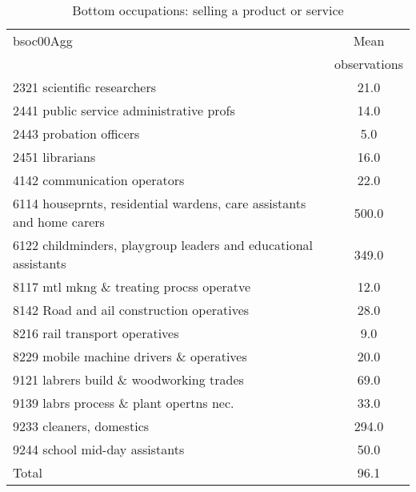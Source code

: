 \begin{table}
	\centering
	\caption{Bottom occupations: selling a product or service}
	\begin{tabular}{lc}
	\toprule	
		
bsoc00Agg&Mean \\
&observations \\
\hline
2321 scientific researchers&21.0 \\
2441 public service administrative profs&14.0 \\
2443 probation officers&5.0 \\
2451 librarians&16.0 \\
4142 communication operators&22.0 \\
6114 houseprnts, residential wardens, care assistants and home carers&500.0 \\
6122 childminders, playgroup leaders and educational assistants&349.0 \\
8117 mtl mkng \& treating procss operatve&12.0 \\
8142 Road and ail construction operatives&28.0 \\
8216 rail transport operatives&9.0 \\
8229 mobile machine drivers \& operatives&20.0 \\
9121 labrers build \& woodworking trades&69.0 \\
9139 labrs process \& plant opertns nec.&33.0 \\
9233 cleaners, domestics&294.0 \\
9244 school mid-day assistants&50.0 \\
Total&96.1 \\
\bottomrule
\bottomrule
\end{tabular}
\end{table}
